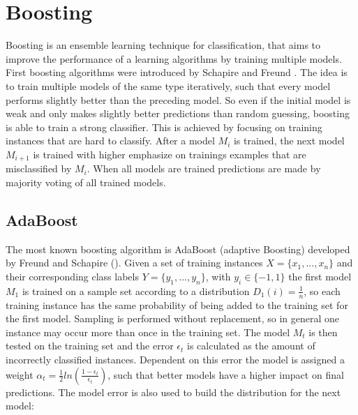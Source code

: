 \documentclass[10pt]{reportMaster}
\begin{document}




\section{Boosting}
\label{sec:boosting}
Boosting is an ensemble learning technique for classification, that aims to improve the performance of a learning algorithms by training multiple models.
First boosting algorithms were introduced by Schapire \cite{boostingSchapire} and Freund \cite{boostingFreund}.
The idea is to train multiple models of the same type iteratively, such that every model performs slightly better than the preceding model.
So even if the initial model is weak and only makes slightly better predictions than random guessing, boosting is able to train a strong classifier.
This is achieved by focusing on training instances that are hard to classify.
After a model $M_i$ is trained, the next model $M_{i+1}$ is trained with higher emphasize on trainings examples that are misclassified by $M_i$. 
When all models are trained predictions are made by majority voting of all trained models.

\subsection{AdaBoost}
\label{sec:adaBoost}
The most known boosting algorithm is AdaBoost (adaptive Boosting) developed by Freund and Schapire (\cite{boostingIntro}).
Given a set of training instances $X = \{x_1, ..., x_n\}$ and their corresponding class labels $Y = \{y_1, ..., y_n\}$, with $y_i \in \{-1, 1\}$ the first model $M_1$ is trained on a sample set according to a distribution $D_1(i) = \frac{1}{n}$, so each training instance has the same probability of being added to the training set for the first model.
Sampling is performed without replacement, so in general one instance may occur more than once in the training set.
The model $M_t$ is then tested on the training set and the error $\epsilon_t$ is calculated as the amount of incorrectly classified instances.
Dependent on this error the model is assigned a weight $\alpha_t = \frac{1}{2} ln(\frac{1 - \epsilon_t}{\epsilon_t})$, such that better models have a higher impact on final predictions.
The model error is also used to build the distribution for the next model: 
\end{document}

